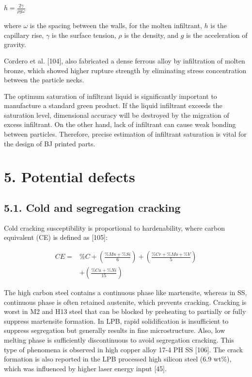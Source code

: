 \documentclass[10pt]{article}
\begin{document}
$h=\frac{2 \gamma}{\rho g \omega}$

where $\omega$ is the spacing between the walls, for the molten infiltrant, $h$ is the capillary rise, $\gamma$ is the surface tension, $\rho$ is the density, and $g$ is the acceleration of gravity.

Cordero et al. [104], also fabricated a dense ferrous alloy by infiltration of molten bronze, which showed higher rupture strength by eliminating stress concentration between the particle necks.

The optimum saturation of infiltrant liquid is significantly important to manufacture a standard green product. If the liquid infiltrant exceeds the saturation level, dimensional accuracy will be destroyed by the migration of excess infiltrant. On the other hand, lack of infiltrant can cause weak bonding between particles. Therefore, precise estimation of infiltrant saturation is vital for the design of BJ printed parts.

\section*{5. Potential defects}
\subsection*{5.1. Cold and segregation cracking}
Cold cracking susceptibility is proportional to hardenability, where carbon equivalent (CE) is defined as [105]:


\begin{align*}
C E= & \% C+\left(\frac{\% M n+\% S i}{6}\right)+\left(\frac{\% C r+\% M o+\% V}{5}\right) \\
& +\left(\frac{\% C u+\% N i}{15}\right) \tag{4.1}
\end{align*}


The high carbon steel contains a continuous phase like martensite, whereas in SS, continuous phase is often retained austenite, which prevents cracking. Cracking is worst in M2 and H13 steel that can be blocked by preheating to partially or fully suppress martensite formation. In LPB, rapid solidification is insufficient to suppress segregation but generally results in fine microstructure. Also, low melting phase is sufficiently discontinuous to avoid segregation cracking. This type of phenomena is observed in high copper alloy 17-4 PH SS [106]. The crack formation is also reported in the LPB processed high silicon steel (6.9 wt\%), which was influenced by higher laser energy input [45].
\end{document}
